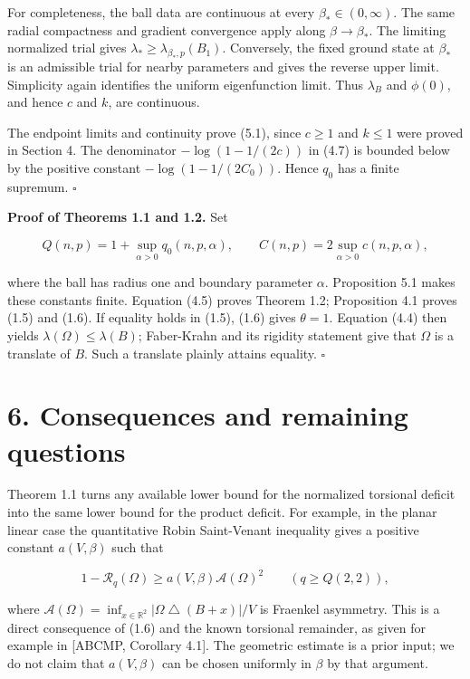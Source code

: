 \documentclass[11pt]{article}
\begin{document}
For completeness, the ball data are continuous at every
\(\beta_*\in(0,\infty)\). The same radial compactness and gradient
convergence apply along \(\beta\to\beta_*\). The limiting normalized
trial gives \(\lambda_*\geq\lambda_{\beta_*,p}(B_1)\). Conversely, the
fixed ground state at \(\beta_*\) is an admissible trial for nearby
parameters and gives the reverse upper limit. Simplicity again
identifies the uniform eigenfunction limit. Thus \(\lambda_B\) and
\(\phi(0)\), and hence \(c\) and \(k\), are continuous.

The endpoint limits and continuity prove (5.1), since \(c\geq1\) and
\(k\leq1\) were proved in Section 4. The denominator \(-\log(1-1/(2c))\)
in (4.7) is bounded below by the positive constant
\(-\log(1-1/(2C_0))\). Hence \(q_0\) has a finite supremum. \(\square\)

\textbf{Proof of Theorems 1.1 and 1.2.} Set

\[Q(n,p)=1+\sup_{\alpha>0}q_0(n,p,\alpha),\qquad
C(n,p)=2\sup_{\alpha>0}c(n,p,\alpha),\tag{5.8}\]

where the ball has radius one and boundary parameter \(\alpha\).
Proposition 5.1 makes these constants finite. Equation (4.5) proves
Theorem 1.2; Proposition 4.1 proves (1.5) and (1.6). If equality holds
in (1.5), (1.6) gives \(\theta=1\). Equation (4.4) then yields
\(\lambda(\Omega)\leq\lambda(B)\); Faber-Krahn and its rigidity
statement give that \(\Omega\) is a translate of \(B\). Such a translate
plainly attains equality. \(\square\)

\section{6. Consequences and remaining
questions}\label{consequences-and-remaining-questions}

Theorem 1.1 turns any available lower bound for the normalized torsional
deficit into the same lower bound for the product deficit. For example,
in the planar linear case the quantitative Robin Saint-Venant inequality
gives a positive constant \(a(V,\beta)\) such that

\[1-\mathcal R_q(\Omega)\geq a(V,\beta)\mathcal A(\Omega)^2
\qquad(q\geq Q(2,2)),\tag{6.1}\]

where
\(\mathcal A(\Omega)=\inf_{x\in\mathbb R^2}|\Omega\mathbin\triangle(B+x)|/V\)
is Fraenkel asymmetry. This is a direct consequence of (1.6) and the
known torsional remainder, as given for example in {[}ABCMP, Corollary
4.1{]}. The geometric estimate is a prior input; we do not claim that
\(a(V,\beta)\) can be chosen uniformly in \(\beta\) by that argument.
\end{document}
